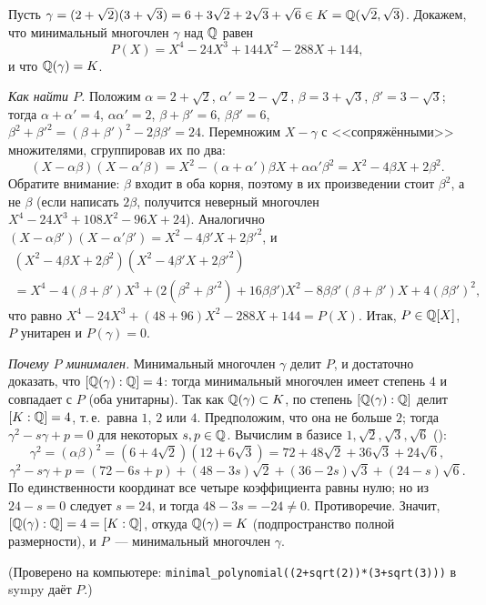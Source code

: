 \begin{example}
Пусть $\gamma=(2+\sqrt2)(3+\sqrt3)=6+3\sqrt2+2\sqrt3+\sqrt6\in K=\mathbb Q(\sqrt2,\sqrt3)$. Докажем, что минимальный многочлен
$\gamma$ над $\mathbb Q$ равен
\[
P(X)=X^4-24X^3+144X^2-288X+144,
\]
и что $\mathbb Q(\gamma)=K$.

\emph{Как найти $P$.} Положим $\alpha=2+\sqrt2$, $\alpha'=2-\sqrt2$, $\beta=3+\sqrt3$, $\beta'=3-\sqrt3$; тогда
$\alpha+\alpha'=4$, $\alpha\alpha'=2$, $\beta+\beta'=6$, $\beta\beta'=6$, $\beta^2+\beta'^2=(\beta+\beta')^2-2\beta\beta'=24$.
Перемножим $X-\gamma$ с <<сопряжёнными>> множителями, сгруппировав их по два:
\[
(X-\alpha\beta)(X-\alpha'\beta)=X^2-(\alpha+\alpha')\beta X+\alpha\alpha'\beta^2=X^2-4\beta X+2\beta^2.
\]
Обратите внимание: $\beta$ входит в оба корня, поэтому в их произведении стоит $\beta^2$, а не $\beta$ (если написать
$2\beta$, получится неверный многочлен $X^4-24X^3+108X^2-96X+24$). Аналогично
$(X-\alpha\beta')(X-\alpha'\beta')=X^2-4\beta'X+2\beta'^2$, и
\begin{multline*}
(X^2-4\beta X+2\beta^2)(X^2-4\beta'X+2\beta'^2)\\
=X^4-4(\beta+\beta')X^3+\bigl(2(\beta^2+\beta'^2)+16\beta\beta'\bigr)X^2-8\beta\beta'(\beta+\beta')X+4(\beta\beta')^2,
\end{multline*}
что равно $X^4-24X^3+(48+96)X^2-288X+144=P(X)$. Итак, $P\in\mathbb Q[X]$, $P$ унитарен и $P(\gamma)=0$.

\emph{Почему $P$ минимален.} Минимальный многочлен $\gamma$ делит $P$, и достаточно доказать, что $[\mathbb Q(\gamma):\mathbb Q]=4$:
тогда минимальный многочлен имеет степень $4$ и совпадает с $P$ (оба унитарны). Так как $\mathbb Q(\gamma)\subset K$, по 
степень $[\mathbb Q(\gamma):\mathbb Q]$ делит $[K:\mathbb Q]=4$, т.\,е.\ равна $1$, $2$ или $4$. Предположим, что она не больше $2$; тогда
$\gamma^2-s\gamma+p=0$ для некоторых $s,p\in\mathbb Q$. Вычислим в базисе $1,\sqrt2,\sqrt3,\sqrt6$ ():
\[
\gamma^2=(\alpha\beta)^2=(6+4\sqrt2)(12+6\sqrt3)=72+48\sqrt2+36\sqrt3+24\sqrt6,
\]
\[
\gamma^2-s\gamma+p=(72-6s+p)+(48-3s)\sqrt2+(36-2s)\sqrt3+(24-s)\sqrt6.
\]
По единственности координат все четыре коэффициента равны нулю; но из $24-s=0$ следует $s=24$, и тогда $48-3s=-24\ne0$.
Противоречие. Значит, $[\mathbb Q(\gamma):\mathbb Q]=4=[K:\mathbb Q]$, откуда $\mathbb Q(\gamma)=K$ (подпространство полной размерности), и $P$~---
минимальный многочлен $\gamma$.

(Проверено на компьютере: \texttt{minimal\_polynomial((2+sqrt(2))*(3+sqrt(3)))} в sympy даёт $P$.)
\end{example}

